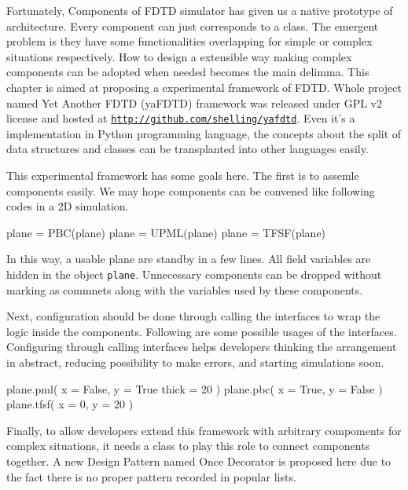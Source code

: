 Fortunately, Components of FDTD simulator has given us a native prototype of architecture. Every component can just
corresponds to a class. The emergent problem is they have some functionalities overlapping for simple or complex
situations respectively. How to design a extensible way making complex components can be adopted when needed becomes the
main delimma. This chapter is aimed at proposing a experimental framework of FDTD. Whole project named Yet Another FDTD
(yaFDTD) framework was released under GPL v2 license and hosted at
\texttt{\url{http://github.com/shelling/yafdtd}}. Even it's a implementation in Python programming language, the
concepts about the split of data structures and classes can be transplanted into other languages easily.

This experimental framework has some goals here. The first is to assemle components easily. We may hope components can
be convened like following codes in a 2D simulation.
\begin{code}
  plane = PBC(plane)
  plane = UPML(plane)
  plane = TFSF(plane)
\end{code}
In this way, a usable plane are standby in a few lines. All field variables are hidden in the object
\texttt{plane}. Unnecessary components can be dropped without marking as commnets along with the variables used by these
components.

Next, configuration should be done through calling the interfaces to wrap the logic inside the components. Following are
some possible usages of the interfaces. Configuring through calling interfaces helps developers thinking the arrangement
in abstract, reducing possibility to make errors, and starting simulations soon.
\begin{code}
  plane.pml(
    x = False,
    y = True
    thick = 20
  )
  plane.pbc(
    x = True,
    y = False
  )
  plane.tfsf(
    x = 0,
    y = 20
  )
\end{code}
Finally, to allow developers extend this framework with arbitrary compoments for complex situations, it needs a class to
play this role to connect components together. A new Design Pattern named Once Decorator is proposed here due to the
fact there is no proper pattern recorded in popular lists.
